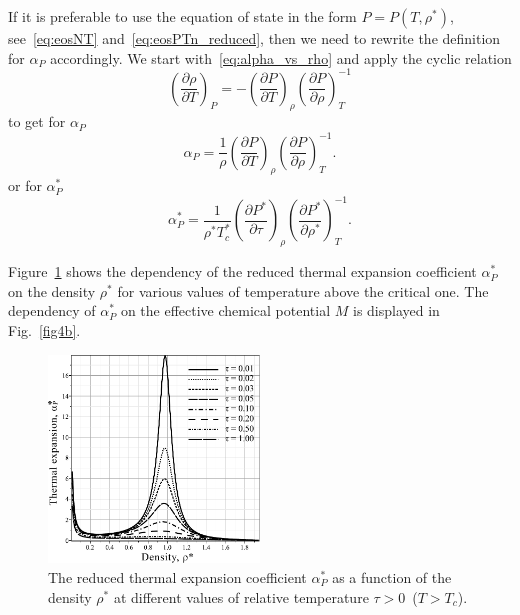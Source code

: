 If it is preferable to use the equation of state in the form $P=P(T, \rho^*)$, see~\eqref{eq:eosNT} and~\eqref{eq:eosPTn_reduced}, then we need to rewrite the definition for $\alpha_P$ accordingly. We start with~\eqref{eq:alpha_vs_rho} and apply the cyclic relation
\begin{equation}
	\left(\frac{\partial \rho}{\partial T}\right)_P = - \left(\frac{\partial P}{\partial T}\right)_{\rho} \left(\frac{\partial P}{\partial \rho}\right)^{-1}_T
\end{equation}
to get for $\alpha_P$
\begin{equation}
	\alpha_P = \frac{1}{\rho} \left(\frac{\partial P}{\partial T}\right)_{\rho} \left(\frac{\partial P}{\partial \rho}\right)^{-1}_T.
\end{equation}
or for $\alpha^*_P$
\begin{equation}
	\alpha^*_P = \frac{1}{\rho^* T^*_c} \left(\frac{\partial P^*}{\partial \tau}\right)_{\rho} \left(\frac{\partial P^*}{\partial \rho^*}\right)^{-1}_T.
\end{equation}

Figure~\ref{fig4a} shows the dependency of the reduced thermal expansion coefficient $\alpha^*_P$ on the density $\rho^*$ for various values of temperature above the critical one. The dependency of $\alpha^*_P$ on the effective chemical potential $M$ is displayed in Fig.~\ref{fig4b}.

\begin{figure}[h!]
	\centering \includegraphics[width=0.5\textwidth]{f4a.pdf}
	\vskip-3mm\caption{The reduced thermal expansion coefficient $\alpha^*_P$ as a function of the density $\rho^*$ at different values of relative temperature $\tau > 0$~($T > T_c$). 
	}\label{fig4a}
\end{figure}

